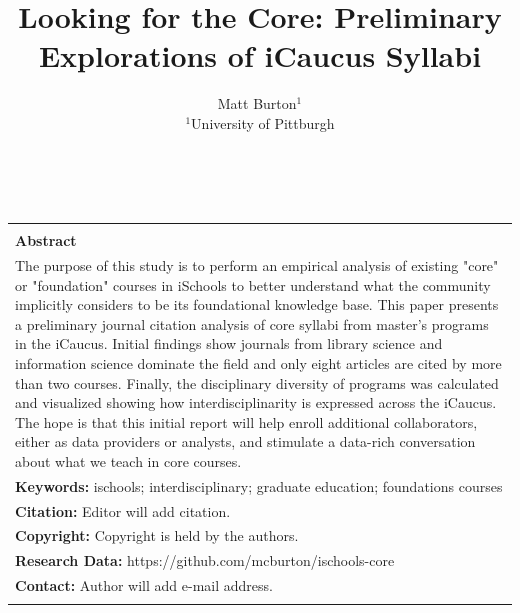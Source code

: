 \documentclass[10pt, letterpaper]{article}
\title{Looking for the Core: Preliminary Explorations of iCaucus Syllabi}
\date{} %
\author{%
{\large Matt Burton$^{1}$\\} %
$^{1}$University of Pittburgh\\ %
}
\makeatletter
\renewcommand{\maketitle}{\bgroup\setlength{\parindent}{0pt}
\begin{flushleft}
  {\sffamily \Large {\@title} }
  \vspace{12pt}\\
  \@author
\end{flushleft}\egroup
}
\makeatother
\begin{document}
\newenvironment{blockquote}{\list{}{\leftmargin=0.5in\rightmargin=0.0in}\item[]}{\endlist}
\renewcommand{\listfigurename}{Table of Figures} 
\renewcommand{\listtablename}{Table of Tables} 
\maketitle %
\thispagestyle{empty} %


\begin{center}
\begin{tabularx}{\textwidth}{|X|}
\hline
\vspace{2pt}\\
\textbf{Abstract}\\
The purpose of this study is to perform an empirical analysis of existing "core" or "foundation" courses in iSchools to better understand what the community implicitly considers to be its foundational knowledge base. This paper presents a preliminary journal citation analysis of core syllabi from master's programs in the iCaucus. Initial findings show journals from library science and information science dominate the field and only eight articles are cited by more than two courses. Finally, the disciplinary diversity of programs was calculated and visualized showing how interdisciplinarity is expressed across the iCaucus. The hope is that this initial report will help enroll additional collaborators, either as data providers or analysts, and stimulate a data-rich conversation about what we teach in core courses.\\
{\footnotesize \textbf{Keywords:} ischools; interdisciplinary; graduate education; foundations courses}\\
{\footnotesize \textbf{Citation:}  Editor will add citation.}\\
{\footnotesize \textbf{Copyright:} Copyright is held by the authors.}\\
{\footnotesize \textbf{Research Data:}  https://github.com/mcburton/ischools-core} \\ %
{\footnotesize \textbf{Contact:} Author will add e-mail address.}\\ %
\vspace{2pt}\\
\hline
\end{tabularx}
\end{center}
\end{document}
